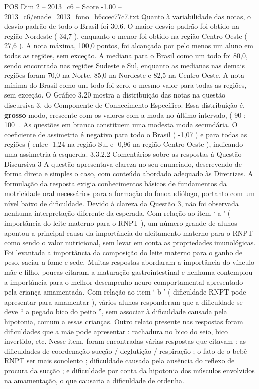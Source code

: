 \begin{textsample}{POS Dim 2 – 2013\_c6 – Score -1.00 – 2013\_c6/enade\_2013\_fono\_b6ccec77c7.txt}
Quanto à variabilidade das notas, o desvio padrão de todo o Brasil foi 30,6.
O maior desvio padrão foi obtido na região Nordeste ( 34,7 ), enquanto o menor foi obtido na região Centro-Oeste ( 27,6 ).
A nota máxima, 100,0 pontos, foi alcançada por pelo menos um aluno em todas as regiões, sem exceção.
A mediana para o Brasil como um todo foi 80,0, sendo encontrada nas regiões Sudeste e Sul, enquanto as medianas nas demais regiões foram 70,0 na Norte, 85,0 na Nordeste e 82,5 na Centro-Oeste.
A nota mínima do Brasil como um todo foi zero, o mesmo valor para todas as regiões, sem exceção.
O Gráfico 3.20 mostra a distribuição das notas na questão discursiva 3, do Componente de Conhecimento Específico.
Essa distribuição é, \textbf{grosso} modo, crescente com os valores com a moda no último intervalo, ( 90 ; 100 ].
As questões em branco constituem uma modesta moda secundária.
O coeficiente de assimetria é negativo para todo o Brasil ( -1,07 ) e para todas as regiões ( entre -1,24 na região Sul e -0,96 na região Centro-Oeste ), indicando uma assimetria à esquerda. 3.3.2.2 Comentários sobre as respostas à Questão Discursiva 3 A questão apresentava clareza no seu enunciado, descrevendo de forma direta e simples o caso, com conteúdo abordado adequado às Diretrizes.
A formulação da resposta exigia conhecimentos básicos de fundamentos da motricidade oral necessários para a formação do fonoaudiólogo, portanto com um nível baixo de dificuldade.
Devido à clareza da Questão 3, não foi observada nenhuma interpretação diferente da esperada.
Com relação ao item ‘ a ’ ( importância do leite materno para o RNPT ), um número grande de alunos apontou a principal causa da importância do aleitamento materno para o RNPT como sendo o valor nutricional, sem levar em conta as propriedades imunológicas.
Foi levantada a importância da composição do leite materno para o ganho de peso, saciar a fome e sede.
Muitas respostas abordaram a importância do vínculo mãe e filho, poucas citaram a maturação gastrointestinal e nenhuma contemplou a importância para o melhor desempenho neuro-comportamental apresentado pela criança amamentada.
Com relação ao item ‘ b ’ ( dificuldade RNPT pode apresentar para amamentar ), vários alunos responderam que a dificuldade se deve “ a pegado bico do peito ”, sem associar à dificuldade causada pela hipotonia, comum a essas crianças.
Outro relato presente nas respostas foram dificuldades que a mãe pode apresentar : rachadura no bico do seio, bico invertido, etc.
Nesse item, foram encontradas várias respostas que citavam : as dificuldades de coordenação sucção / deglutição / respiração ; o fato de o bebê RNPT ser mais sonolento ; dificuldade causada pela ausência do reflexo de procura da sucção ; e dificuldade por conta da hipotonia dos músculos envolvidos na amamentação, o que causaria a dificuldade de ordenha.

\end{textsample}
